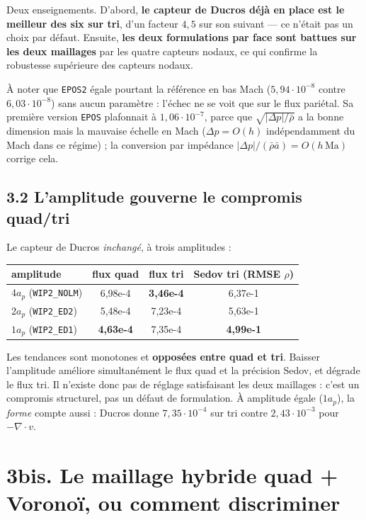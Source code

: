 \documentclass[11pt,a4paper]{article}
\begin{document}
Deux enseignements. D'abord, \textbf{le capteur de Ducros déjà en place est le meilleur
des six sur tri}, d'un facteur $4{,}5$ sur son suivant --- ce n'était pas un choix par
défaut. Ensuite, \textbf{les deux formulations par face sont battues sur les deux
maillages} par les quatre capteurs nodaux, ce qui confirme la robustesse supérieure des
capteurs nodaux.

À noter que \texttt{EPOS2} égale pourtant la référence en bas Mach ($5{,}94\cdot10^{-8}$
contre $6{,}03\cdot10^{-8}$) sans aucun paramètre : l'échec ne se voit que sur le flux
pariétal. Sa première version \texttt{EPOS} plafonnait à $1{,}06\cdot10^{-7}$, parce que
$\sqrt{|\Delta p|/\bar\rho}$ a la bonne dimension mais la mauvaise échelle en Mach
($\Delta p = O(h)$ indépendamment du Mach dans ce régime) ; la conversion par impédance
$|\Delta p|/(\bar\rho\bar a) = O(h\,\mathrm{Ma})$ corrige cela.

\subsection*{3.2 L'amplitude gouverne le compromis quad/tri}

Le capteur de Ducros \emph{inchangé}, à trois amplitudes :

\begin{table}[h]\centering
\begin{tabular}{lccc}
\toprule
amplitude & flux quad & flux tri & Sedov tri (RMSE $\rho$) \\
\midrule
$4a_p$ (\texttt{WIP2\_NOLM}) & 6{,}98e-4 & \textbf{3{,}46e-4} & 6{,}37e-1 \\
$2a_p$ (\texttt{WIP2\_ED2})  & 5{,}48e-4 & 7{,}23e-4 & 5{,}63e-1 \\
$1a_p$ (\texttt{WIP2\_ED1})  & \textbf{4{,}63e-4} & 7{,}35e-4 & \textbf{4{,}99e-1} \\
\bottomrule
\end{tabular}
\end{table}

Les tendances sont monotones et \textbf{opposées entre quad et tri}. Baisser
l'amplitude améliore simultanément le flux quad et la précision Sedov, et dégrade le
flux tri. Il n'existe donc pas de réglage satisfaisant les deux maillages : c'est un
compromis structurel, pas un défaut de formulation. À amplitude égale ($1a_p$), la
\emph{forme} compte aussi : Ducros donne $7{,}35\cdot10^{-4}$ sur tri contre
$2{,}43\cdot10^{-3}$ pour $-\nabla\!\cdot\!v$.

\section*{3bis. Le maillage hybride quad + Voronoï, ou comment discriminer}
\end{document}
